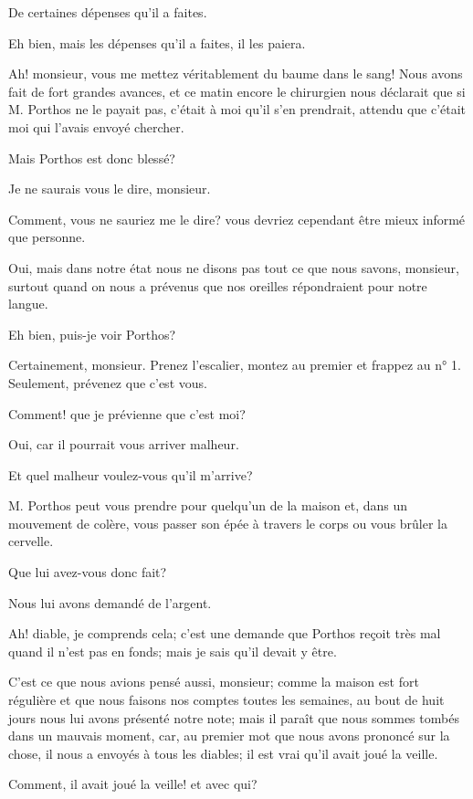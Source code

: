 \speak  De certaines dépenses qu'il a faites. 

\speak  Eh bien, mais les dépenses qu'il a faites, il les paiera. 

\speak  Ah! monsieur, vous me mettez véritablement du baume dans le sang! Nous avons fait de fort grandes avances, et ce matin encore le chirurgien nous déclarait que si M. Porthos ne le payait pas, c'était à moi qu'il s'en prendrait, attendu que c'était moi qui l'avais envoyé chercher. 

\speak  Mais Porthos est donc blessé? 

\speak  Je ne saurais vous le dire, monsieur. 

\speak  Comment, vous ne sauriez me le dire? vous devriez cependant être mieux informé que personne. 

\speak  Oui, mais dans notre état nous ne disons pas tout ce que nous savons, monsieur, surtout quand on nous a prévenus que nos oreilles répondraient pour notre langue. 

\speak  Eh bien, puis-je voir Porthos? 

\speak  Certainement, monsieur. Prenez l'escalier, montez au premier et frappez au n° 1. Seulement, prévenez que c'est vous. 

\speak  Comment! que je prévienne que c'est moi? 

\speak  Oui, car il pourrait vous arriver malheur. 

\speak  Et quel malheur voulez-vous qu'il m'arrive? 

\speak  M. Porthos peut vous prendre pour quelqu'un de la maison et, dans un mouvement de colère, vous passer son épée à travers le corps ou vous brûler la cervelle. 

\speak  Que lui avez-vous donc fait? 

\speak  Nous lui avons demandé de l'argent. 

\speak  Ah! diable, je comprends cela; c'est une demande que Porthos reçoit très mal quand il n'est pas en fonds; mais je sais qu'il devait y être. 

\speak  C'est ce que nous avions pensé aussi, monsieur; comme la maison est fort régulière et que nous faisons nos comptes toutes les semaines, au bout de huit jours nous lui avons présenté notre note; mais il paraît que nous sommes tombés dans un mauvais moment, car, au premier mot que nous avons prononcé sur la chose, il nous a envoyés à tous les diables; il est vrai qu'il avait joué la veille. 

\speak  Comment, il avait joué la veille! et avec qui? 


